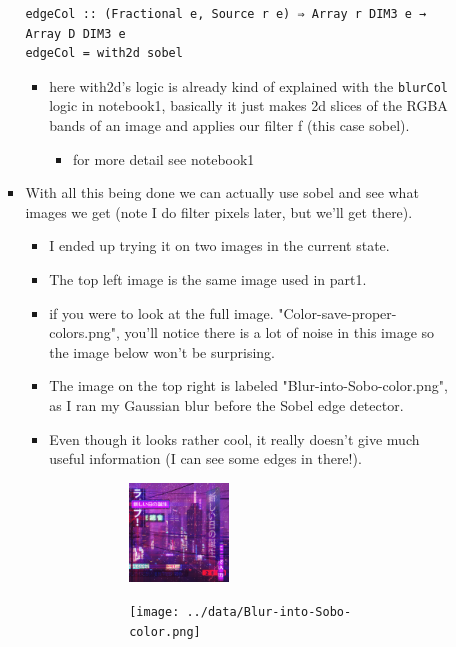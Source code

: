 \documentclass{article}
\begin{document}
\begin{enumerate}
\begin{enumerate}
\begin{itemize}
\begin{verbatim}
edgeCol :: (Fractional e, Source r e) ⇒ Array r DIM3 e → Array D DIM3 e
edgeCol = with2d sobel
\end{verbatim}
\begin{itemize}
\item here with2d's logic is already kind of explained with the
\texttt{blurCol} logic in notebook1, basically it just makes 2d slices of
the RGBA bands of an image and applies our filter f (this case sobel).
\begin{itemize}
\item for more detail see notebook1
\end{itemize}
\end{itemize}
\item With all this being done we can actually use sobel and see what
images we get (note I do filter pixels later, but we'll get there).
\begin{itemize}
\item I ended up trying it on two images in the current state.
\item The top left image is the same image used in part1.
\item if you were to look at the full image.
"Color-save-proper-colors.png", you'll notice there is a lot of
noise in this image so the image below won't be surprising.
\item The image on the top right is labeled "Blur-into-Sobo-color.png", as I
ran my Gaussian blur before the Sobel edge detector.
\item Even though it looks rather cool, it really doesn't give much
useful information (I can see some edges in there!).
\begin{figure}
  \centering
  \begin{subfigure}
    \centering
    \includegraphics[width=0.4\textwidth]{../data/Color-test.png}
  \end{subfigure}%
  \begin{subfigure}
    \centering
    \texttt{[image: ../data/Blur-into-Sobo-color.png]}

\end{subfigure}
\end{figure}
\end{itemize}
\end{itemize}
\end{enumerate}
\end{enumerate}
\end{document}
